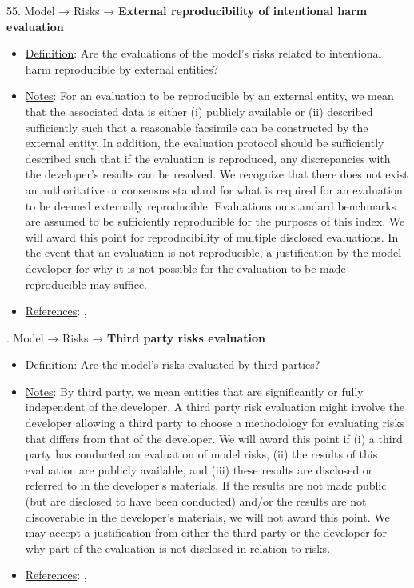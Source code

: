 55. Model → Risks → \textbf{External reproducibility of intentional harm evaluation}
\vspace{-\parskip}
\begin{itemize}
\item
\underline{Definition}: Are the evaluations of the model’s risks related to intentional harm reproducible by external entities?
\item
\underline{Notes}: For an evaluation to be reproducible by an external entity, we mean that the associated data is either (i) publicly available or (ii) described sufficiently such that a reasonable facsimile can be constructed by the external entity. In addition, the evaluation protocol should be sufficiently described such that if the evaluation is reproduced, any discrepancies with the developer's results can be resolved. We recognize that there does not exist an authoritative or consensus standard for what is required for an evaluation to be deemed externally reproducible. Evaluations on standard benchmarks are assumed to be sufficiently reproducible for the purposes of this index. We will award this point for reproducibility of multiple disclosed evaluations. In the event that an evaluation is not reproducible, a justification by the model developer for why it is not possible for the evaluation to be made reproducible may suffice.
\item
\underline{References}: \citet{kapoor2023leakage}, \citet{weidinger2021ethical}
\end{itemize} \vspace{\baselineskip}


. Model → Risks → \textbf{Third party risks evaluation}
\vspace{-\parskip}
\begin{itemize}
\item
\underline{Definition}: Are the model’s risks evaluated by third parties?
\item
\underline{Notes}: By third party, we mean entities that are significantly or fully independent of the developer. A third party risk evaluation might involve the developer allowing a third party to choose a methodology for evaluating risks that differs from that of the developer. We will award this point if (i) a third party has conducted an evaluation of model risks, (ii) the results of this evaluation are publicly available, and (iii) these results are disclosed or referred to in the developer’s materials. If the results are not made public (but are disclosed to have been conducted) and/or the results are not discoverable in the developer’s materials, we will not award this point. We may accept a justification from either the third party or the developer for why part of the evaluation is not disclosed in relation to risks.
\item
\underline{References}: \citet{raji2022audit}, \citet{weidinger2021ethical}
\end{itemize} \vspace{\baselineskip}


